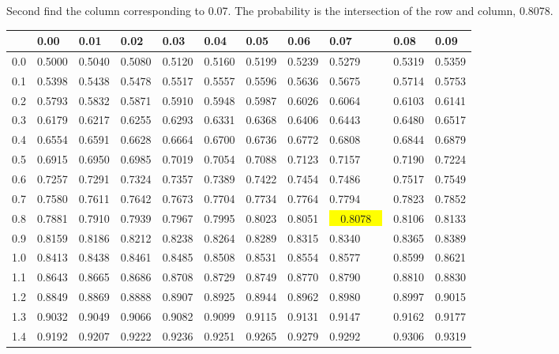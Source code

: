 \begin{frame}
{\small Second find the column corresponding to 0.07. The probability is the
intersection of the row and column, 0.8078.}

  {
\fontsize{5pt}{5pt}
\selectfont

\begin{tabular}{l|lllllll>{\columncolor{light-blue}}lll}
     & 0.00   & 0.01   & 0.02   & 0.03   & 0.04   & 0.05   & 0.06   & 0.07   & 0.08  & 0.09 \\ \hline
0.0 & 0.5000 & 0.5040 & 0.5080 & 0.5120 & 0.5160 & 0.5199 & 0.5239 & 0.5279 & 0.5319 & 0.5359 \\ 
0.1 & 0.5398 & 0.5438 & 0.5478 & 0.5517 & 0.5557 & 0.5596 & 0.5636 & 0.5675 & 0.5714 & 0.5753 \\ 
0.2 & 0.5793 & 0.5832 & 0.5871 & 0.5910 & 0.5948 & 0.5987 & 0.6026 & 0.6064 & 0.6103 & 0.6141 \\ 
0.3 & 0.6179 & 0.6217 & 0.6255 & 0.6293 & 0.6331 & 0.6368 & 0.6406 & 0.6443 & 0.6480 & 0.6517 \\ 
0.4 & 0.6554 & 0.6591 & 0.6628 & 0.6664 & 0.6700 & 0.6736 & 0.6772 & 0.6808 & 0.6844 & 0.6879 \\ 
0.5 & 0.6915 & 0.6950 & 0.6985 & 0.7019 & 0.7054 & 0.7088 & 0.7123 & 0.7157 & 0.7190 & 0.7224 \\ 
0.6 & 0.7257 & 0.7291 & 0.7324 & 0.7357 & 0.7389 & 0.7422 & 0.7454 & 0.7486 & 0.7517 & 0.7549 \\ 
0.7 & 0.7580 & 0.7611 & 0.7642 & 0.7673 & 0.7704 & 0.7734 & 0.7764 & 0.7794 & 0.7823 & 0.7852 \\ 
\rowcolor{light-red}0.8 & 0.7881 & 0.7910 & 0.7939 & 0.7967 & 0.7995 & 0.8023 & 0.8051 & {\colorbox{yellow}{~~0.8078~~}} & 0.8106 & 0.8133 \\ 
0.9 & 0.8159 & 0.8186 & 0.8212 & 0.8238 & 0.8264 & 0.8289 & 0.8315 & 0.8340 & 0.8365 & 0.8389 \\ 
1.0 & 0.8413 & 0.8438 & 0.8461 & 0.8485 & 0.8508 & 0.8531 & 0.8554 & 0.8577 & 0.8599 & 0.8621 \\ 
1.1 & 0.8643 & 0.8665 & 0.8686 & 0.8708 & 0.8729 & 0.8749 & 0.8770 & 0.8790 & 0.8810 & 0.8830 \\ 
1.2 & 0.8849 & 0.8869 & 0.8888 & 0.8907 & 0.8925 & 0.8944 & 0.8962 & 0.8980 & 0.8997 & 0.9015 \\ 
1.3 & 0.9032 & 0.9049 & 0.9066 & 0.9082 & 0.9099 & 0.9115 & 0.9131 & 0.9147 & 0.9162 & 0.9177 \\ 
1.4 & 0.9192 & 0.9207 & 0.9222 & 0.9236 & 0.9251 & 0.9265 & 0.9279 & 0.9292 & 0.9306 & 0.9319 \\ 

\end{tabular}}
\end{frame}
